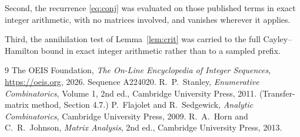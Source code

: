 \documentclass[11pt,a4paper]{article}
\theoremstyle{plain}
\theoremstyle{definition}
\begin{document}
Second, the recurrence \eqref{eq:conj} was evaluated on those published terms in exact
integer arithmetic, with no matrices involved, and vanishes wherever it applies.

Third, the annihilation test of Lemma~\ref{lem:crit} was carried to the full
Cayley--Hamilton bound in exact integer arithmetic rather than to a sampled prefix.

\begin{thebibliography}{9}
 The OEIS Foundation, \emph{The On-Line Encyclopedia of Integer
Sequences}, \url{https://oeis.org}, 2026. Sequence A224020.
 R.~P.~Stanley, \emph{Enumerative Combinatorics}, Volume 1, 2nd ed.,
Cambridge University Press, 2011. (Transfer-matrix method, Section 4.7.)
 P.~Flajolet and R.~Sedgewick, \emph{Analytic Combinatorics}, Cambridge
University Press, 2009.
 R.~A.~Horn and C.~R.~Johnson, \emph{Matrix Analysis}, 2nd ed., Cambridge
University Press, 2013.
\end{thebibliography}
\end{document}
